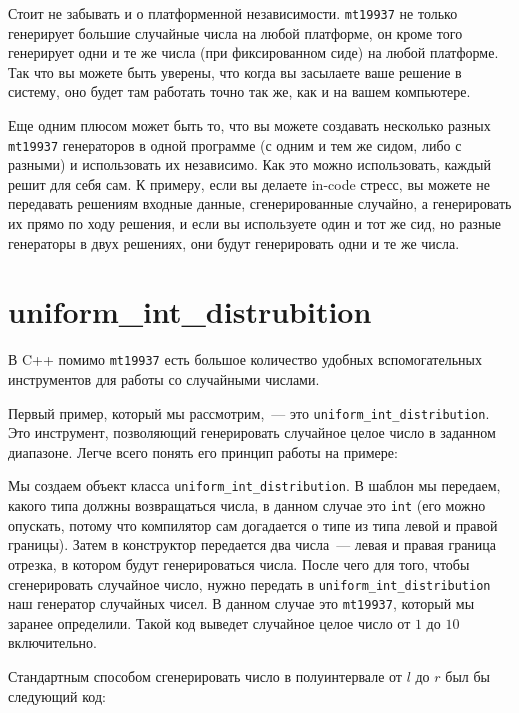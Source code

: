 Стоит не забывать и о платформенной независимости. \verb+mt19937+ не только генерирует большие случайные числа на любой платформе, он кроме того генерирует одни и те же числа (при фиксированном сиде) на любой платформе. Так что вы можете быть уверены, что когда вы засылаете ваше решение в систему, оно будет там работать точно так же, как и на вашем компьютере.

Еще одним плюсом может быть то, что вы можете создавать несколько разных \verb+mt19937+ генераторов в одной программе (с одним и тем же сидом, либо с разными) и использовать их независимо. Как это можно использовать, каждый решит для себя сам. К примеру, если вы делаете in-code стресс, вы можете не передавать решениям входные данные, сгенерированные случайно, а генерировать их прямо по ходу решения, и если вы используете один и тот же сид, но разные генераторы в двух решениях, они будут генерировать одни и те же числа.

\section{uniform\_int\_distrubition}

В C++ помимо \verb+mt19937+ есть большое количество удобных вспомогательных инструментов для работы со случайными числами.

Первый пример, который мы рассмотрим,~--- это \verb+uniform_int_distribution+. Это инструмент, позволяющий генерировать случайное целое число в заданном диапазоне. Легче всего понять его принцип работы на примере:



Мы создаем объект класса \verb+uniform_int_distribution+. В шаблон мы передаем, какого типа должны возвращаться числа, в данном случае это \verb+int+ (его можно опускать, потому что компилятор сам догадается о типе из типа левой и правой границы). Затем в конструктор передается два числа~--- левая и правая граница отрезка, в котором будут генерироваться числа. После чего для того, чтобы сгенерировать случайное число, нужно передать в \verb+uniform_int_distribution+ наш генератор случайных чисел. В данном случае это \verb+mt19937+, который мы заранее определили. Такой код выведет случайное целое число от $1$ до $10$ включительно.

Стандартным способом сгенерировать число в полуинтервале от $l$ до $r$ был бы следующий код:




